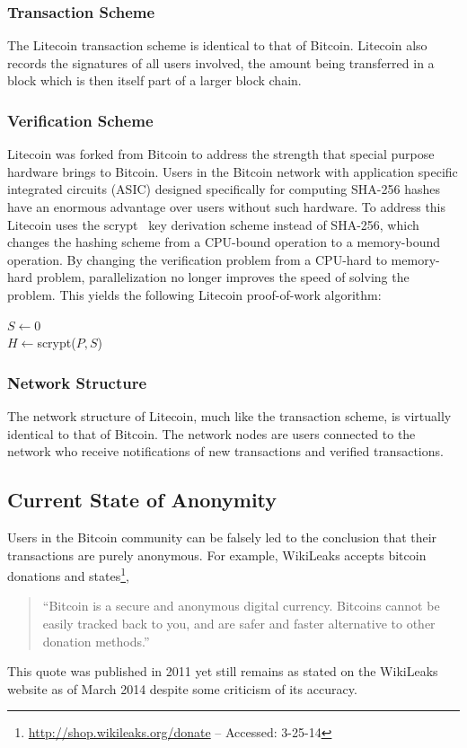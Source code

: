 \documentclass[11pt]{article}
\begin{document}
\subsubsection{Transaction Scheme}
The Litecoin transaction scheme is identical to that of
Bitcoin. Litecoin also records the signatures of all users involved, the amount
being transferred in a block which is then itself part of a larger block
chain.

\subsubsection{Verification Scheme}
Litecoin was forked from Bitcoin to address the strength that special purpose
hardware brings to Bitcoin. Users in the Bitcoin network with application
specific integrated circuits (ASIC) designed specifically for computing SHA-256
hashes have an enormous advantage over users without such hardware. To address
this Litecoin uses the scrypt~\cite{percival09} key derivation scheme instead of SHA-256,
which changes the hashing scheme from a CPU-bound operation to a memory-bound
operation. By changing the verification problem from a CPU-hard to memory-hard problem,
parallelization no longer improves the speed of solving the
problem. This yields the following Litecoin proof-of-work algorithm:
\begin{algorithm}
    $S \gets 0$\\
    $H \gets ${\sc scrypt($P, S$)}\\
\end{algorithm}

\subsubsection{Network Structure}
The network structure of Litecoin, much like the transaction scheme, is
virtually identical to that of Bitcoin. The network nodes are users connected to
the network who receive notifications of new transactions and verified
transactions.

\subsection{Current State of Anonymity}
Users in the Bitcoin community can be falsely led to the conclusion that their
transactions are purely anonymous. For example, WikiLeaks accepts bitcoin
donations and states\footnote{\url{http://shop.wikileaks.org/donate} --
Accessed: 3-25-14},
\begin{quote}
``Bitcoin is a secure and anonymous digital currency. Bitcoins cannot be easily
tracked back to you, and are safer and faster alternative to other donation
methods.''
\end{quote}
This quote was published in 2011 yet still remains as stated on the WikiLeaks
website as of March 2014 despite some criticism of its accuracy.
\end{document}
